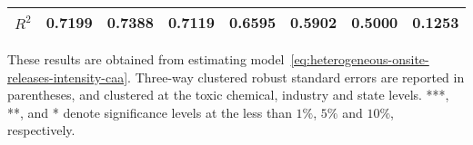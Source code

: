 \begin{table}[H]
{\begin{tabular}{@{}llllllll@{}}
            $R^2$                           & 0.7199    & 0.7388        & 0.7119    & 0.6595       & 0.5902          & 0.5000        & 0.1253              \\ \bottomrule\bottomrule
        \end{tabular}%
    }
    \begin{minipage}{18cm}
        \vspace{0.05in}
        These results are obtained from estimating model~\ref{eq:heterogeneous-onsite-releases-intensity-caa}. Three-way clustered robust standard errors are reported in parentheses, and clustered at the toxic chemical, industry and state levels. ***, **, and * denote significance levels at the less than $1\%$, $5\%$ and $10\%$, respectively.
    \end{minipage}
\end{table}